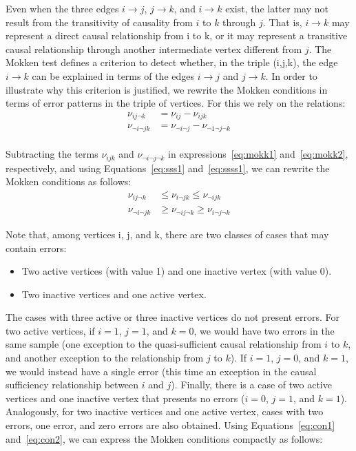 \documentclass[12pt,a4paper]{report}
\begin{document}
Even when the three edges $i \to j$, $j \to k$, and $i \to k$ exist, the latter may not result from the transitivity of causality from $i$ to $k$ through $j$. That is, $i \to k$ may represent a direct causal relationship from i to k, or it may represent a transitive causal relationship through another intermediate vertex different from $j$. The Mokken test defines a criterion to detect whether, in the triple (i,j,k), the edge $i \to k$ can be explained in terms of the edges $i \to j$ and $j \to k$. In order to illustrate why this criterion is justified, we rewrite the Mokken conditions in terms of error patterns in the triple of vertices. For this we rely on the relations:
\begin{align}
\label{eq:sss1}
\nu_{ij \neg k} &= \nu_{ij} - \nu_{ijk} \\
\label{eq:ssss1}
\nu_{\neg i \neg j k} &= \nu_{\neg i \neg j} - \nu_{\neg 1 \neg j \neg k}
\end{align}
\\   
Subtracting the terms $\nu_{ijk}$ and $\nu_{\neg i \neg j \neg k}$ in expressions~\ref{eq:mokk1} and~\ref{eq:mokk2}, respectively, and using Equations~\ref{eq:sss1} and~\ref{eq:ssss1}, we can rewrite the Mokken conditions as follows:
\begin{align}
\label{eq:con1}
\nu_{ij \neg k} &\leq \nu_{i \neg j k} \leq \nu_{\neg i jk} \\
\label{eq:con2}
\nu_{\neg i \neg j k} &\geq \nu_{\neg i j \neg k} \geq \nu_{i \neg j \neg k} 
\end{align}


Note that, among vertices i, j, and k, there are two classes of cases that may contain errors:
\begin{itemize}
\item Two active vertices (with value 1) and one inactive vertex (with value 0).
\item Two inactive vertices and one active vertex.
\end{itemize}
The cases with three active or three inactive vertices do not present errors. For two active vertices, if $i = 1$, $j = 1$, and $k = 0$, we would have two errors in the same sample (one exception to the quasi-sufficient causal relationship from $i$ to $k$, and another exception to the relationship from $j$ to $k$). If $i = 1$, $j = 0$, and $k = 1$, we would instead have a single error (this time an exception in the causal sufficiency relationship between $i$ and $j$). Finally, there is a case of two active vertices and one inactive vertex that presents no errors ($i = 0$, $j = 1$, and $k = 1$). Analogously, for two inactive vertices and one active vertex, cases with two errors, one error, and zero errors are also obtained. Using Equations~\ref{eq:con1} and~\ref{eq:con2}, we can express the Mokken conditions compactly as follows:
\end{document}
